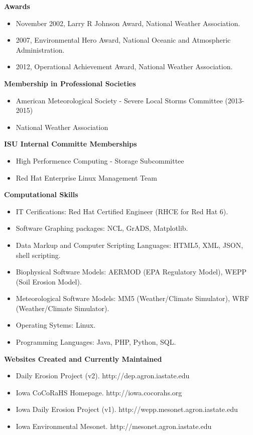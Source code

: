 \normalsize \sf
\Large \bf Awards\\
\normalsize \sf
\begin{itemize}
\item November 2002, Larry R Johnson Award, National Weather Association.
\item 2007, Environmental Hero Award, National Oceanic and Atmospheric Administration.
\item 2012, Operational Achievement Award, National Weather Association.
\end{itemize}
\Large \bf Membership in Professional Societies\\
\normalsize \sf	
\begin{itemize}
\item American Meteorological Society - Severe Local Storms Committee (2013-2015)
\item National Weather Association
\end{itemize}
\Large \bf ISU Internal Committe Memberships\\
\normalsize \sf
\begin{itemize}
\item High Performence Computing - Storage Subcommittee
\item Red Hat Enterprise Linux Management Team
\end{itemize} 
\Large \bf Computational Skills\\
\normalsize \sf
\begin{itemize}
\item IT Cerifications: Red Hat Certified Engineer (RHCE for Red Hat 6).
\item Software Graphing packages: NCL, GrADS, Matplotlib.
\item Data Markup and Computer Scripting Languages: HTML5, XML, JSON, shell scripting.
\item Biophysical Software Models: AERMOD (EPA Regulatory Model), WEPP (Soil Erosion Model).
\item Meteorological Software Models: MM5 (Weather/Climate Simulator), WRF (Weather/Climate Simulator).
\item Operating Sytems: Linux.
\item Programming Languages: Java, PHP, Python, SQL.
\end{itemize} 
\Large \bf Websites Created and Currently Maintained\\
\normalsize \sf
\begin{itemize}
\item Daily Erosion Project (v2). http://dep.agron.iastate.edu
\item Iowa CoCoRaHS Homepage. http://iowa.cocorahs.org
\item Iowa Daily Erosion Project (v1). http://wepp.mesonet.agron.iastate.edu
\item Iowa Environmental Mesonet. http://mesonet.agron.iastate.edu
\end{itemize}
